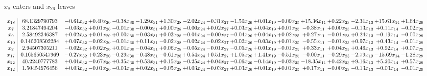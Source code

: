 \documentclass[9pt]{article}
\begin{document}
 $ x_{8} $ enters and $ x_{26} $ leaves 

 \[\begin{array}{c| c c@{\hskip 2pt} c@{\hskip 2pt} c@{\hskip 2pt} c@{\hskip 2pt} c@{\hskip 2pt} c@{\hskip 2pt} c@{\hskip 2pt} c@{\hskip 2pt} c@{\hskip 2pt} c@{\hskip 2pt} c@{\hskip 2pt} c@{\hskip 2pt} c@{\hskip 2pt} c@{\hskip 2pt} c@{\hskip 2pt} }
 x_{18}   &  68.1329790793 & -0.61 x_{32} & +  0.40 x_{20} & -0.38 x_{30} & -1.29 x_{31} & +  1.30 x_{28} & -2.02 x_{24} & -0.31 x_{27} & -1.50 x_{26} & +  0.01 x_{19} & -0.09 x_{25} & + 15.36 x_{11} & +  0.22 x_{23} & -2.31 x_{13} & + 15.61 x_{14} & +  1.64 x_{29}\\
 x_{7}   &  3.21847494204 & -0.03 x_{32} & +  0.01 x_{20} & -0.01 x_{30} & -0.00 x_{31} & +  0.00 x_{28} & -0.00 x_{24} & +  0.02 x_{27} & +  0.03 x_{26} & +  0.04 x_{19} & +  0.01 x_{25} & -0.38 x_{11} & +  0.00 x_{23} & -0.13 x_{13} & +  0.11 x_{14} & -0.02 x_{29}\\
 x_{9}   &  2.58492346387 & +  0.02 x_{32} & +  0.01 x_{20} & +  0.00 x_{30} & -0.03 x_{31} & +  0.03 x_{28} & -0.01 x_{24} & -0.00 x_{27} & -0.04 x_{26} & +  0.04 x_{19} & +  0.02 x_{25} & +  0.27 x_{11} & -0.01 x_{23} & +  0.24 x_{13} & -0.19 x_{14} & -0.00 x_{29}\\
 x_{10}   &  0.146208502284 & +  0.07 x_{32} & -0.02 x_{20} & -0.01 x_{30} & +  0.11 x_{31} & -0.02 x_{28} & -0.02 x_{24} & -0.02 x_{27} & +  0.02 x_{26} & -0.03 x_{19} & +  0.01 x_{25} & -0.55 x_{11} & -0.01 x_{23} & +  0.97 x_{13} & +  0.43 x_{14} & -0.01 x_{29}\\
 x_{2}   &  2.94507305211 & -0.02 x_{32} & +  0.02 x_{20} & +  0.01 x_{30} & -0.04 x_{31} & +  0.06 x_{28} & -0.05 x_{24} & -0.01 x_{27} & -0.05 x_{26} & +  0.01 x_{19} & -0.01 x_{25} & +  0.33 x_{11} & +  0.04 x_{23} & +  0.46 x_{13} & +  0.92 x_{14} & +  0.07 x_{29}\\
 x_{17}   &  0.165650547969 & -0.27 x_{32} & +  0.23 x_{20} & -0.29 x_{30} & -0.48 x_{31} & -0.61 x_{28} & +  0.54 x_{24} & +  0.51 x_{27} & +  1.05 x_{26} & +  1.41 x_{19} & -0.51 x_{25} & -0.00 x_{11} & -0.29 x_{23} & -2.79 x_{13} & -15.69 x_{14} & -1.28 x_{29}\\
 x_{22}   &  40.2240777783 & +  0.01 x_{32} & -0.67 x_{20} & +  0.35 x_{30} & +  0.53 x_{31} & +  0.15 x_{28} & -0.25 x_{24} & +  0.04 x_{27} & -0.06 x_{26} & -0.14 x_{19} & -0.03 x_{25} & -18.35 x_{11} & +  0.42 x_{23} & +  9.16 x_{13} & +  5.20 x_{14} & +  0.57 x_{29}\\
 x_{12}   &  1.50454976456 & +  0.03 x_{32} & -0.01 x_{20} & -0.03 x_{30} & +  0.02 x_{31} & -0.05 x_{28} & +  0.03 x_{24} & -0.03 x_{27} & +  0.03 x_{26} & +  0.01 x_{19} & +  0.01 x_{25} & +  0.17 x_{11} & -0.00 x_{23} & -0.13 x_{13} & -0.03 x_{14} & -0.01 x_{29}\\

\end{array}\]
\end{document}
